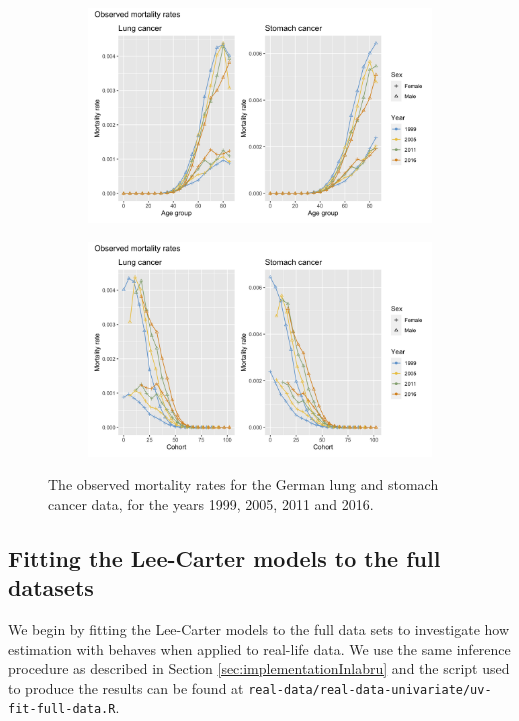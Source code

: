 \begin{figure}
    \centering
    \begin{subfigure}[b]{.45\linewidth}
        \includegraphics[width=\linewidth]{real-data/real-data-univariate/Figures/data-age-rate.png}
    \end{subfigure}
    \begin{subfigure}[b]{.45\linewidth}
        \includegraphics[width=\linewidth]{real-data/real-data-univariate/Figures/data-cohort-rate.png}
    \end{subfigure}
    \caption{The observed mortality rates for the German lung and stomach cancer data, for the years 1999, 2005, 2011 and 2016.}
    \label{fig:data-rate}
\end{figure}

\subsection{Fitting the Lee-Carter models to the full datasets}
\label{sec:LC-full-data}
We begin by fitting the Lee-Carter models to the full data sets to investigate how estimation with \inlabru behaves when applied to real-life data. We use the same inference procedure as described in Section \ref{sec:implementationInlabru} and the script used to produce the results can be found at \texttt{real-data/real-data-univariate/uv-fit-full-data.R}.

